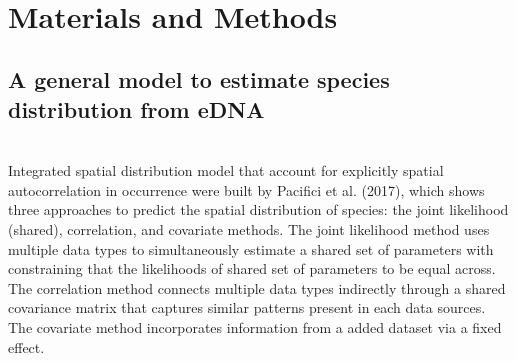 \documentclass[12pt]{article}
\begin{document}
\begin{linenumbers}


\ \\

\section{Materials and Methods}


\subsection{A general model to estimate species distribution from eDNA}
\\
Integrated spatial distribution model that account for explicitly spatial autocorrelation in occurrence were built by Pacifici et al. (2017), which shows three approaches to predict the spatial distribution of species: the joint likelihood (shared), correlation, and covariate methods. The joint likelihood method uses multiple data types to simultaneously estimate a shared set of parameters with constraining that the likelihoods of shared set of parameters to be equal across. The correlation method connects multiple data types indirectly through a shared covariance matrix that captures similar patterns present in each data sources. The covariate method incorporates information from a added dataset via a fixed effect. 


\end{linenumbers}
\end{document}
